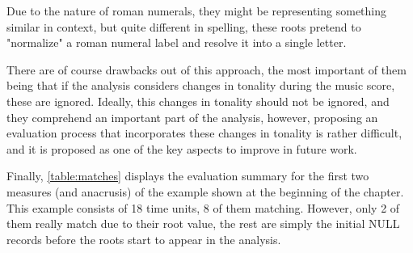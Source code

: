 		Due to the nature of roman numerals, they might be representing something similar in context, but quite different in spelling, these roots pretend to "normalize" a roman numeral label and resolve it into a single letter.

		There are of course drawbacks out of this approach, the most important of them being that if the analysis considers changes in tonality during the music score, these are ignored. Ideally, this changes in tonality should not be ignored, and they comprehend an important part of the analysis, however, proposing an evaluation process that incorporates these changes in tonality is rather difficult, and it is proposed as one of the key aspects to improve in future work.

		Finally, \autoref{table:matches} displays the evaluation summary for the first two measures (and anacrusis) of the example shown at the beginning of the chapter. This example consists of 18 time units, 8 of them matching. However, only 2 of them really match due to their root value, the rest are simply the initial NULL records before the roots start to appear in the analysis.

\newpage
